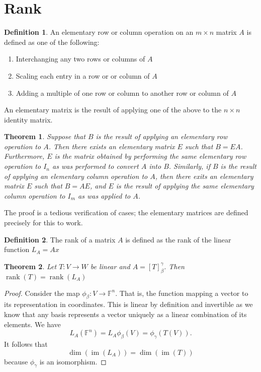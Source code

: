 \documentclass[oneside, 12pt]{book}
\DeclareMathOperator{\rank}{rank}
\DeclareMathOperator{\im}{im}
\newtheorem{thm}{Theorem}[section]
\theoremstyle{definition}
\newtheorem{defn}{Definition}[section]
\begin{document}
\section{Rank}
\begin{defn}
\label{defn_elmop}
  An elementary row or column operation on an $m \times n$ matrix $A$ is defined as one of the following:
  \begin{enumerate}
    \item Interchanging any two rows or columns of $A$
    \item Scaling each entry in a row or or column of $A$
    \item Adding a multiple of one row or column to another row or column of $A$
  \end{enumerate}
  An elementary matrix is the result of applying one of the above to the $n \times n$ identity matrix.
\end{defn}
\begin{thm}
\label{thm_elmop}
  Suppose that $B$ is the result of applying an elementary row operation to $A$. Then there exists an elementary matrix $E$ such that $B=EA$. Furthermore, $E$ is the matrix obtained by performing the same elementary row operation to $I_{n}$ as was performed to convert $A$ into $B$. Similarly, if $B$ is the result of applying
  an elementary column operation to $A$, then there exits an elementary matrix $E$ such that $B=AE$, and $E$ is the result of applying the same elementary column operation to $I_{m}$ as was applied to $A$.
\end{thm}
The proof is a tedious verification of cases; the elementary matrices are defined precisely for this to work.
\begin{defn}
\label{defn_rnk}
The rank of a matrix $A$ is defined as the rank of the linear function $L_{A}=Ax$
\end{defn}
\begin{thm}
\label{rnkeq}
  Let $T: V \to W$ be linear and $A=[T]_{\beta}^{\gamma}$. Then $\rank(T)=\rank(L_{A})$
\end{thm}
\begin{proof}
  Consider the map $\phi_{\beta}:V \to \mathbb{F}^{n}$. That is, the function mapping a vector to its representation in coordinates. This is linear by definition and invertible as we know that any basis represents a vector uniquely as a linear combination of its elements. We have
  \[L_{A}(\mathbb{F}^{n})=L_{A}\phi_{\beta}(V)=\phi_{\gamma}(T(V)).\] It follows  that \[\dim(\im(L_{A}))=\dim(\im(T))\] because $\phi_{\gamma}$ is an isomorphism.
\end{proof}
\end{document}

